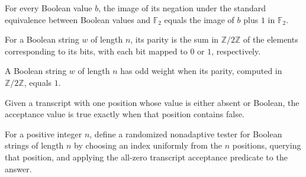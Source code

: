 \begin{theorem}
\leanok
{}
For every Boolean value $b$, the image of its negation under the standard equivalence
between Boolean values and $\mathbb F_2$ equals the image of $b$ plus $1$ in $\mathbb
F_2$.
\end{theorem}

\begin{definition}
\label{FABL.boolStringParity}
\leanok
{}
For a Boolean string $w$ of length $n$, its parity is the sum in
$\mathbb{Z}/2\mathbb{Z}$ of the elements corresponding to its bits, with each bit mapped
to $0$ or $1$, respectively.
\end{definition}

\begin{definition}
\label{FABL.IsOddWeightString}
\leanok
{}
A Boolean string $w$ of length $n$ has odd weight when its parity, computed in
$\mathbb{Z}/2\mathbb{Z}$, equals $1$.
\end{definition}

\begin{definition}
\label{FABL.allZeroTranscriptAccept}
\leanok
Given a transcript with one position whose value is either absent or Boolean, the
acceptance value is true exactly when that position contains false.
\end{definition}

\begin{definition}
\label{FABL.allZeroStringTester}
\leanok
{}
For a positive integer $n$, define a randomized nonadaptive tester for Boolean strings
of length $n$ by choosing an index uniformly from the $n$ positions, querying that
position, and applying the all-zero transcript acceptance predicate to the answer.
\end{definition}

